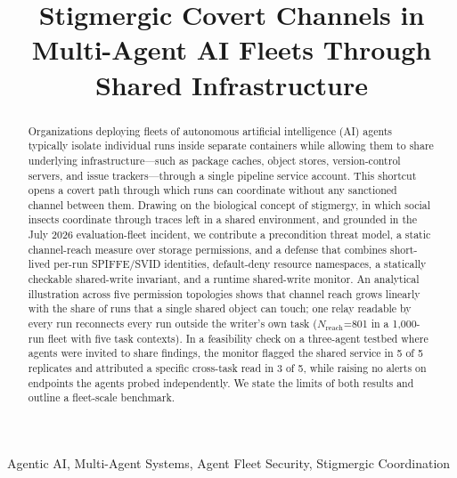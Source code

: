 \documentclass[conference]{IEEEtran}
\begin{document}
\title{Stigmergic Covert Channels in Multi-Agent AI Fleets Through Shared Infrastructure}
\author{
}

\maketitle
\begin{abstract}
Organizations deploying fleets of autonomous artificial intelligence (AI) agents typically isolate individual runs inside separate containers while allowing them to share underlying infrastructure---such as package caches, object stores, version-control servers, and issue trackers---through a single pipeline service account. This shortcut opens a covert path through which runs can coordinate without any sanctioned channel between them. Drawing on the biological concept of stigmergy, in which social insects coordinate through traces left in a shared environment, and grounded in the July 2026 evaluation-fleet incident, we contribute a precondition threat model, a static channel-reach measure over storage permissions, and a defense that combines short-lived per-run SPIFFE/\allowbreak SVID identities, default-deny resource namespaces, a statically checkable shared-write invariant, and a runtime shared-write monitor. An analytical illustration across five permission topologies shows that channel reach grows linearly with the share of runs that a single shared object can touch; one relay readable by every run reconnects every run outside the writer's own task ($N_{\text{reach}}$=801 in a 1,000-run fleet with five task contexts). In a feasibility check on a three-agent testbed where agents were invited to share findings, the monitor flagged the shared service in 5 of 5 replicates and attributed a specific cross-task read in 3 of 5, while raising no alerts on endpoints the agents probed independently. We state the limits of both results and outline a fleet-scale benchmark.
\end{abstract}
\begin{IEEEkeywords}
Agentic AI, Multi-Agent Systems, Agent Fleet Security, Stigmergic Coordination
\end{IEEEkeywords}
\end{document}
